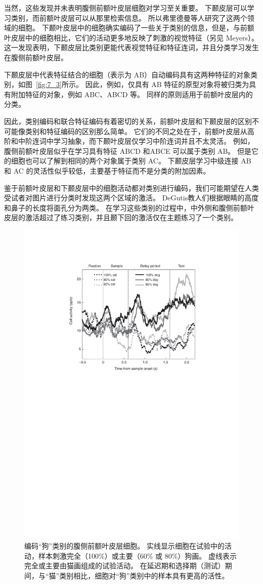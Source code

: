 当然，这些发现并未表明腹侧前额叶皮层细胞对学习至关重要。 
下颞皮层可以学习类别，而前额叶皮层可以从那里检索信息。 
所以弗里德曼等人\cite{freedman2003comparison}研究了这两个领域的细胞。 
下颞叶皮层中的细胞确实编码了一些关于类别的信息，但是，与前额叶皮层中的细胞相比，它们的活动更多地反映了刺激的视觉特征（另见 Meyers\cite{meyers2008dynamic}）。 
这一发现表明，下颞皮层比类别更能代表视觉特征和特征连词，并且分类学习发生在腹侧前额叶皮层。
\par

下颞皮层中代表特征结合的细胞（表示为 AB）自动编码具有这两种特征的对象类别，如图~\ref{fig:7_3}所示。
因此，例如，仅具有 AB 特征的原型对象将被归类为具有附加特征的对象，例如 ABC、ABCD 等。
同样的原则适用于前额叶皮层内的分类。
\par


因此，类别编码和联合特征编码有着密切的关系，前额叶皮层和下颞皮层的区别不可能像类别和特征编码的区别那么简单。 
它们的不同之处在于，前额叶皮层从高阶和中阶连词中学习抽象，而下颞叶皮层仅学习中阶连词并且不太灵活。
例如，腹侧前额叶皮层似乎在学习具有特征 ABCD 和ABCE 可以属于类别 AB。 
但是它的细胞也可以了解到相同的两个对象属于类别 AC。 
下颞皮层学习中级连接 AB 和 AC 的灵活性似乎较低，主要基于特征而不是分类的附加因素。
\par


鉴于前额叶皮层和下颞皮层中的细胞活动都对类别进行编码，我们可能期望在人类受试者对图片进行分类时发现这两个区域的激活。 
DeGutis\cite{degutis2009network}教人们根据眼睛的高度和鼻子的长度将面孔分为两类。 
在学习这些类别的过程中，中外侧和腹侧前额叶皮层的激活超过了练习类别，并且颞下回的激活仅在主题练习了一个类别。


\begin{figure}
	\centering
	\includegraphics[width=0.6\linewidth]{chap7/7_6}
	\caption{编码“狗”类别的腹侧前额叶皮层细胞。 实线显示细胞在试验中的活动，样本刺激完全（100\%）或主要（60\% 或 80\%）狗画。
		虚线表示完全或主要由猫画组成的试验活动。
		在延迟期和选择期（测试）期间，与“猫”类别相比，细胞对“狗”类别中的样本具有更高的活性\cite{freedman2002visual}。\label{fig:7_6}}
\end{figure}
\par


